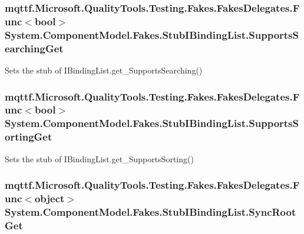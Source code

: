 \hypertarget{class_system_1_1_component_model_1_1_fakes_1_1_stub_i_binding_list_a7586f0b3d0165f5e1bb3b0c3ca1359d1}{
\subsubsection[{Supports\-Searching\-Get}]{\setlength{\rightskip}{0pt plus 5cm}mqttf.\-Microsoft.\-Quality\-Tools.\-Testing.\-Fakes.\-Fakes\-Delegates.\-Func$<$bool$>$ System.\-Component\-Model.\-Fakes.\-Stub\-I\-Binding\-List.\-Supports\-Searching\-Get}}\label{class_system_1_1_component_model_1_1_fakes_1_1_stub_i_binding_list_a7586f0b3d0165f5e1bb3b0c3ca1359d1}


Sets the stub of I\-Binding\-List.\-get\-\_\-\-Supports\-Searching()

\hypertarget{class_system_1_1_component_model_1_1_fakes_1_1_stub_i_binding_list_ad3b1badf2a116d217a4bb0e8a1225335}{
\subsubsection[{Supports\-Sorting\-Get}]{\setlength{\rightskip}{0pt plus 5cm}mqttf.\-Microsoft.\-Quality\-Tools.\-Testing.\-Fakes.\-Fakes\-Delegates.\-Func$<$bool$>$ System.\-Component\-Model.\-Fakes.\-Stub\-I\-Binding\-List.\-Supports\-Sorting\-Get}}\label{class_system_1_1_component_model_1_1_fakes_1_1_stub_i_binding_list_ad3b1badf2a116d217a4bb0e8a1225335}


Sets the stub of I\-Binding\-List.\-get\-\_\-\-Supports\-Sorting()

\hypertarget{class_system_1_1_component_model_1_1_fakes_1_1_stub_i_binding_list_a650ffb1d812f129f4840071d4fff72b5}{
\subsubsection[{Sync\-Root\-Get}]{\setlength{\rightskip}{0pt plus 5cm}mqttf.\-Microsoft.\-Quality\-Tools.\-Testing.\-Fakes.\-Fakes\-Delegates.\-Func$<$object$>$ System.\-Component\-Model.\-Fakes.\-Stub\-I\-Binding\-List.\-Sync\-Root\-Get}}\label{class_system_1_1_component_model_1_1_fakes_1_1_stub_i_binding_list_a650ffb1d812f129f4840071d4fff72b5}


